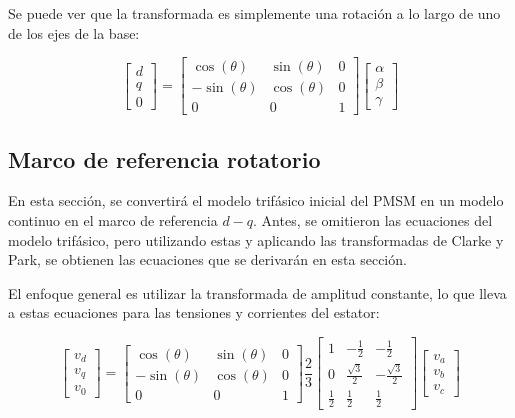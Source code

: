 Se puede ver que la transformada es simplemente una rotación a lo largo de uno de los ejes de la base:

\begin{equation}
    \begin{bmatrix}
        d \\
        q \\
        0
    \end{bmatrix}
    =
    \begin{bmatrix}
        \cos(\theta) & \sin(\theta) & 0 \\
        -\sin(\theta) & \cos(\theta) & 0 \\
        0 & 0 & 1
    \end{bmatrix}
    \begin{bmatrix}
        \alpha \\
        \beta \\
        \gamma
    \end{bmatrix}
\end{equation}

\subsection{Marco de referencia rotatorio}

En esta sección, se convertirá el modelo trifásico inicial del PMSM en un modelo continuo en el marco de referencia $d - q$. Antes, se omitieron las ecuaciones del modelo trifásico, pero utilizando estas y aplicando las transformadas de Clarke y Park, se obtienen las ecuaciones que se derivarán en esta sección.

El enfoque general es utilizar la transformada de amplitud constante, lo que lleva a estas ecuaciones para las tensiones y corrientes del estator:

\begin{equation}
	\begin{bmatrix}
		v_d \\
		v_q \\
		v_0
	\end{bmatrix}
	=
	\begin{bmatrix}
		\cos(\theta) & \sin(\theta) & 0  \\
		-\sin(\theta) & \cos(\theta) & 0  \\
		0 & 0 & 1
	\end{bmatrix}
	\frac{2}{3}
	\begin{bmatrix}
		1 & -\frac{1}{2} & -\frac{1}{2} \\
		0 & \frac{\sqrt{3}}{2} & -\frac{\sqrt{3}}{2} \\
		\frac{1}{2} & \frac{1}{2} & \frac{1}{2}
	\end{bmatrix}
	\begin{bmatrix}
		v_a \\
		v_b \\
		v_c
	\end{bmatrix}
\end{equation}

